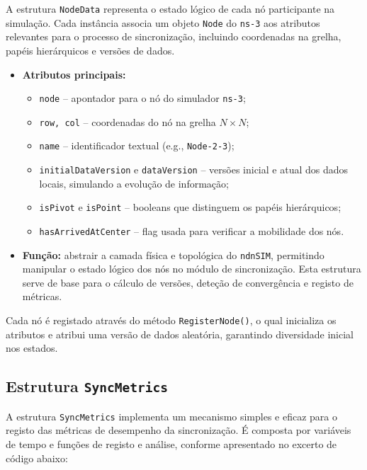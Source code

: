 A estrutura \texttt{NodeData} representa o estado lógico de cada nó participante na simulação. Cada instância associa um objeto \texttt{Node} do \texttt{ns-3} aos atributos relevantes para o processo de sincronização, incluindo coordenadas na grelha, papéis hierárquicos e versões de dados.

\begin{itemize}
    \item \textbf{Atributos principais:}
    \begin{itemize}
        \item \texttt{node} – apontador para o nó do simulador \texttt{ns-3};
        \item \texttt{row, col} – coordenadas do nó na grelha $N\times N$;
        \item \texttt{name} – identificador textual (e.g., \texttt{Node-2-3});
        \item \texttt{initialDataVersion} e \texttt{dataVersion} – versões inicial e atual dos dados locais, simulando a evolução de informação;
        \item \texttt{isPivot} e \texttt{isPoint} – booleans que distinguem os papéis hierárquicos;
        \item \texttt{hasArrivedAtCenter} – flag usada para verificar a mobilidade dos nós.
    \end{itemize}
    \item \textbf{Função:} abstrair a camada física e topológica do \texttt{ndnSIM}, permitindo manipular o estado lógico dos nós no módulo de sincronização. Esta estrutura serve de base para o cálculo de versões, deteção de convergência e registo de métricas.
\end{itemize}

Cada nó é registado através do método \texttt{RegisterNode()}, o qual inicializa os atributos e atribui uma versão de dados aleatória, garantindo diversidade inicial nos estados.

\subsection{Estrutura \texttt{SyncMetrics}}

A estrutura \texttt{SyncMetrics} implementa um mecanismo simples e eficaz para o registo das métricas de desempenho da sincronização. É composta por variáveis de tempo e funções de registo e análise, conforme apresentado no excerto de código abaixo:

